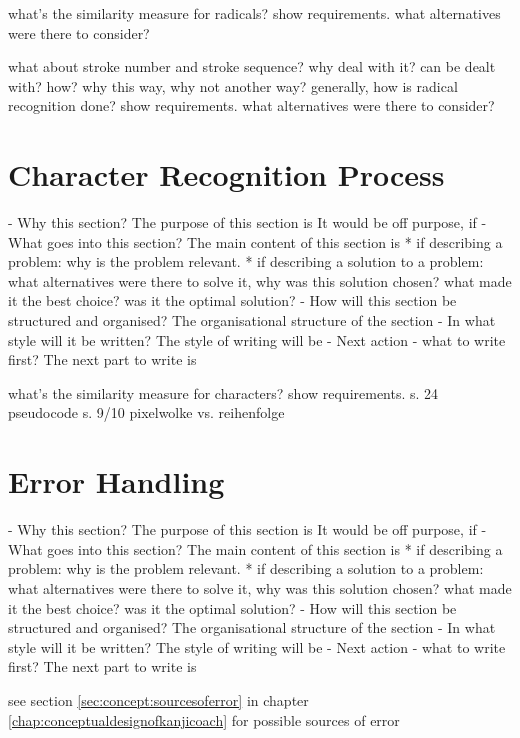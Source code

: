 what's the similarity measure for
radicals?
show requirements.
what alternatives were there to consider?

what about stroke number and stroke sequence?
why deal with it? can be dealt with? 
how? why this way, why not another way?
generally, how is radical recognition done?
show requirements.
what alternatives were there to consider?

\section{Character Recognition Process}
\label{sec:hwre:characterrecognitionprocess}

- Why this section? 
  The purpose of this section is 
  It would be off purpose, if 
- What goes into this section?
  The main content of this section is 
  * if describing a problem: why is the problem relevant.
  * if describing a solution to a problem: what alternatives were
    there to solve it, why was this solution chosen? 
    what made it the best choice? was it the optimal solution?
- How will this section be structured and organised?
  The organisational structure of the section 
- In what style will it be written?
  The style of writing will be 
- Next action - what to write first?
  The next part to write is


what's the similarity measure for
characters?
show requirements.
s. 24 pseudocode
s. 9/10 pixelwolke vs. reihenfolge

\section{Error Handling}
\label{sec:hwre:errorhandling}

- Why this section? 
  The purpose of this section is 
  It would be off purpose, if 
- What goes into this section?
  The main content of this section is 
  * if describing a problem: why is the problem relevant.
  * if describing a solution to a problem: what alternatives were
    there to solve it, why was this solution chosen? 
    what made it the best choice? was it the optimal solution?
- How will this section be structured and organised?
  The organisational structure of the section 
- In what style will it be written?
  The style of writing will be 
- Next action - what to write first?
  The next part to write is



see section \ref{sec:concept:sourcesoferror} in chapter 
\ref{chap:conceptualdesignofkanjicoach} for possible sources of error

